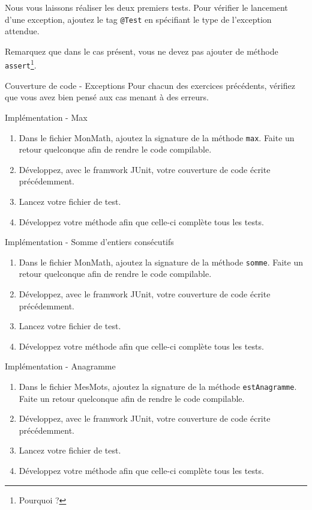 \documentclass[a4paper,11pt]{style-esi/td}
\begin{document}
	Nous vous laissons réaliser les deux premiers tests. Pour vérifier le lancement d'une exception, ajoutez le tag \texttt{@Test} en spécifiant le type de l'exception attendue.

	Remarquez que dans le cas présent, vous ne devez pas ajouter de méthode \texttt{assert}\footnote{Pourquoi ?}.

	\begin{Exercice}{Couverture de code - Exceptions}
		Pour chacun des exercices précédents, vérifiez que vous avez bien pensé aux cas menant à des erreurs.
	\end{Exercice}

	\begin{Exercice}{Implémentation - Max}
		\vspace{-1em}
		\begin{enumerate}
			\item Dans le fichier MonMath, ajoutez la signature de la méthode \texttt{max}. Faite un retour quelconque afin de rendre le code compilable.
			\item Développez, avec le framwork JUnit, votre couverture de code écrite précédemment.
			\item Lancez votre fichier de test.
			\item Développez votre méthode afin que celle-ci complète tous les tests.
		\end{enumerate}
	\end{Exercice}

	\begin{Exercice}{Implémentation - Somme d'entiers consécutifs}
		\vspace{-1em}
		\begin{enumerate}
			\item Dans le fichier MonMath, ajoutez la signature de la méthode \texttt{somme}. Faite un retour quelconque afin de rendre le code compilable.
			\item Développez, avec le framwork JUnit, votre couverture de code écrite précédemment.
			\item Lancez votre fichier de test.
			\item Développez votre méthode afin que celle-ci complète tous les tests.
		\end{enumerate}
	\end{Exercice}
	
	\newpage 
	
	\begin{Exercice}{Implémentation - Anagramme}
		\vspace{-1em}
		\begin{enumerate}
			\item Dans le fichier MesMots, ajoutez la signature de la méthode \texttt{estAnagramme}. Faite un retour quelconque afin de rendre le code compilable.
			\item Développez, avec le framwork JUnit, votre couverture de code écrite précédemment.
			\item Lancez votre fichier de test.
			\item Développez votre méthode afin que celle-ci complète tous les tests.
		\end{enumerate}
	\end{Exercice}
\end{document}
